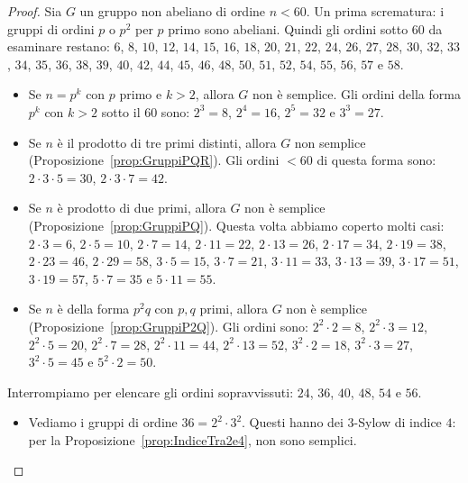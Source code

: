 \begin{proof} Sia $G$ un gruppo non abeliano di ordine $n < 60$. Un prima scrematura: i gruppi di ordini $p$ o $p^2$ per $p$ primo sono abeliani. Quindi gli ordini sotto $60$ da esaminare restano: $6$, $8$, $10$, $12$, $14$, $15$, $16$, $18$, $20$, $21$, $22$, $24$, $26$, $27$, $28$, $30$, $32$, $33$, $34$, $35$, $36$, $38$, $39$, $40$, $42$, $44$, $45$, $46$, $48$, $50$, $51$, $52$, $54$, $55$, $56$, $57$ e $58$.
\begin{itemize}
\item Se $n=p^k$ con $p$ primo e $k>2$, allora $G$ non è semplice. Gli ordini della forma $p^k$ con $k > 2$ sotto il $60$ sono: $2^3 = 8$, $2^4 = 16$, $2^5 = 32$ e $3^3 = 27$. 
\item Se $n$ è il prodotto di tre primi distinti, allora $G$ non semplice (Proposizione~\ref{prop:GruppiPQR}). Gli ordini $< 60$ di questa forma sono: $2 \cdot 3 \cdot 5 = 30$, $2 \cdot 3 \cdot 7 = 42$.
\item Se $n$ è prodotto di due primi, allora $G$ non è semplice (Proposizione~\ref{prop:GruppiPQ}). Questa volta abbiamo coperto molti casi: $2 \cdot 3 = 6$, $2 \cdot 5 = 10$, $2 \cdot 7 = 14$, $2 \cdot 11 = 22$, $2 \cdot 13 = 26$, $2 \cdot 17 = 34$, $2 \cdot 19 = 38$, $2 \cdot 23 = 46$, $2 \cdot 29 = 58$, $3 \cdot 5 = 15$, $3 \cdot 7 = 21$, $3 \cdot 11 = 33$, $3 \cdot 13 = 39$, $3 \cdot 17 = 51$, $3 \cdot 19 = 57$, $5 \cdot 7 = 35$ e $5 \cdot 11 = 55$.
\item Se $n$ è della forma $p^2q$ con $p, q$ primi, allora $G$ non è semplice (Proposizione~\ref{prop:GruppiP2Q}). Gli ordini sono: $2^2 \cdot 2 = 8$, $2^2 \cdot 3 = 12$, $2^2 \cdot 5 = 20$, $2^2 \cdot 7 = 28$, $2^2 \cdot 11 = 44$, $2^2 \cdot 13 = 52$, $3^2 \cdot 2 = 18$, $3^2 \cdot 3 = 27$, $3^2 \cdot 5 = 45$ e $5^2 \cdot 2 = 50$.
\end{itemize}
%
Interrompiamo per elencare gli ordini sopravvissuti: $24$, $36$, $40$, $48$, $54$ e $56$. %
%
\begin{itemize}
\item Vediamo i gruppi di ordine $36 = 2^2 \cdot 3^2$. %
Questi hanno dei $3$-Sylow di indice $4$: per la Proposizione~\ref{prop:IndiceTra2e4}, non sono semplici.

\end{itemize}
\end{proof}
